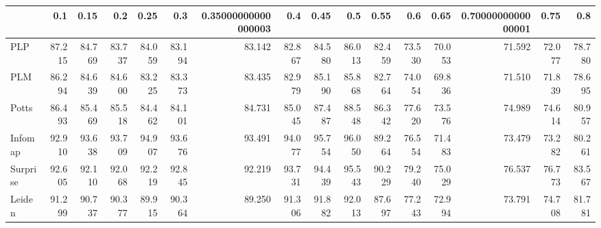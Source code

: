 \begin{tabular}{lrrrrrrrrrrrrrrr}
\toprule
{} &    0.1 &   0.15 &    0.2 &   0.25 &    0.3 & 0.35000000000000003 &    0.4 &   0.45 &    0.5 &   0.55 &    0.6 &   0.65 & 0.7000000000000001 &   0.75 &    0.8 \\
\midrule
PLP      & 87.215 & 84.769 & 83.737 & 84.059 & 83.194 &              83.142 & 82.867 & 84.580 & 86.013 & 82.459 & 73.530 & 70.053 &             71.592 & 72.077 & 78.780 \\
PLM      & 86.294 & 84.639 & 84.600 & 83.225 & 83.373 &              83.435 & 82.979 & 85.190 & 85.868 & 82.764 & 74.054 & 69.836 &             71.510 & 71.839 & 78.695 \\
Potts    & 86.493 & 85.469 & 85.518 & 84.462 & 84.101 &              84.731 & 85.045 & 87.487 & 88.548 & 86.342 & 77.620 & 73.576 &             74.989 & 74.614 & 80.957 \\
Infomap  & 92.910 & 93.638 & 93.709 & 94.907 & 93.676 &              93.491 & 94.077 & 95.754 & 96.050 & 89.264 & 76.554 & 71.483 &             73.479 & 73.282 & 80.261 \\
Surprise & 92.605 & 92.110 & 92.068 & 92.219 & 92.845 &              92.219 & 93.731 & 94.439 & 95.543 & 90.229 & 79.240 & 75.029 &             76.537 & 76.773 & 83.567 \\
Leiden   & 91.299 & 90.737 & 90.377 & 89.915 & 90.364 &              89.250 & 91.306 & 91.882 & 92.013 & 87.697 & 77.243 & 72.994 &             73.791 & 74.708 & 81.781 \\
\bottomrule
\end{tabular}
